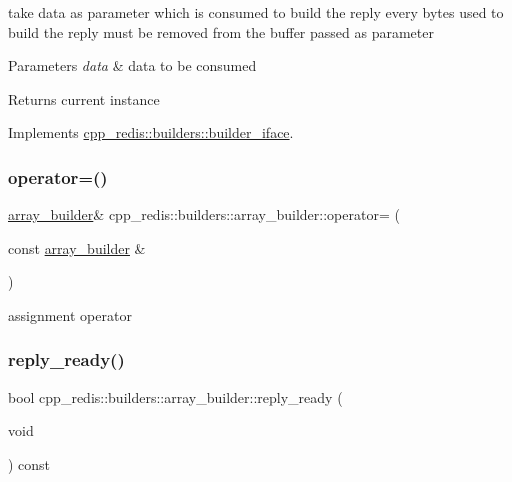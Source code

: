 take data as parameter which is consumed to build the reply every bytes used to build the reply must be removed from the buffer passed as parameter


\begin{DoxyParams}{Parameters}
{\em data} & data to be consumed \\
\hline
\end{DoxyParams}
\begin{DoxyReturn}{Returns}
current instance 
\end{DoxyReturn}


Implements \hyperlink{classcpp__redis_1_1builders_1_1builder__iface_a9892bbc9c887c31c2742dad4476e2fa6}{cpp\+\_\+redis\+::builders\+::builder\+\_\+iface}.

\mbox{\label{classcpp__redis_1_1builders_1_1array__builder_aaa1df845df7a007cf73f95f73e800c2c}} 
\subsubsection{\texorpdfstring{operator=()}{operator=()}}
{\footnotesize\ttfamily \hyperlink{classcpp__redis_1_1builders_1_1array__builder}{array\+\_\+builder}\& cpp\+\_\+redis\+::builders\+::array\+\_\+builder\+::operator= (\begin{DoxyParamCaption}\item[{const \hyperlink{classcpp__redis_1_1builders_1_1array__builder}{array\+\_\+builder} \&}]{ }\end{DoxyParamCaption})\hspace{0.3cm}{\ttfamily [delete]}}



assignment operator 

\mbox{\label{classcpp__redis_1_1builders_1_1array__builder_a524f2cb943dde1246dea1b7057e6351e}} 
\subsubsection{\texorpdfstring{reply\+\_\+ready()}{reply\_ready()}}
{\footnotesize\ttfamily bool cpp\+\_\+redis\+::builders\+::array\+\_\+builder\+::reply\+\_\+ready (\begin{DoxyParamCaption}\item[{void}]{ }\end{DoxyParamCaption}) const\hspace{0.3cm}{\ttfamily [virtual]}}

